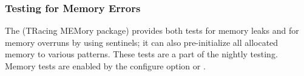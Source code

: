 \documentclass{article}
\begin{document}


\subsubsection{Testing for Memory Errors}
The  (TRacing MEMory package) provides both tests for
memory 
leaks and for memory overruns by using sentinels; it can also
pre-initialize all allocated memory to various patterns.  These tests
are a part of the nightly testing.
Memory tests are enabled by the configure option
 or .
\end{document}
